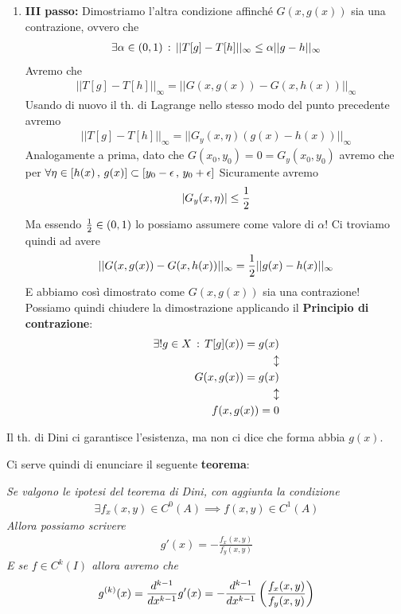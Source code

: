 \begin{enumerate}
	\item \textbf{III passo:} Dimostriamo l'altra condizione affinché $G(x,g(x))$ sia una contrazione, ovvero che
	\begin{align}
		\exists \alpha \in (0,1) \, : \, ||T[g] - T[h]||_\infty \leq \alpha || g -h  ||_\infty 
	\end{align}
	Avremo che
	\begin{align}
		||T[g] - T[h]||_\infty = ||G(x,g(x)) - G(x,h(x))||_\infty
	\end{align}
	Usando di nuovo il th. di Lagrange nello stesso modo del punto precedente avremo
	\begin{align}
		||T[g] - T[h]||_\infty = ||G_y(x,\eta) (g(x) -h(x))||_\infty
	\end{align}
	Analogamente a prima, dato che  $G(x_0,y_0)=0= G_y(x_0,y_0)$ avremo che per $\forall \eta \in [h(x)\, , \, g(x)]\subset[y_0 - \epsilon \, , \, y_0 + \epsilon]$
	Sicuramente avremo
	\begin{align}
		|G_y(x,\eta)|\leq \frac{1}{2}
	\end{align}
	Ma essendo $\frac{1}{2} \in (0,1)$ lo possiamo assumere come valore di $\alpha$! Ci troviamo quindi ad avere
	\begin{align}
		||G(x,g(x)) - G(x,h(x))||_\infty = \frac{1}{2}||g(x) - h(x)||_\infty
	\end{align}
	E abbiamo così dimostrato come $G(x,g(x))$ sia una contrazione! Possiamo quindi chiudere la dimostrazione applicando il \textbf{Principio di contrazione}:
	\begin{align}
		\exists ! g \in X \, : \, T[g](x)) = g(x)\\
		\updownarrow \nonumber \\ 
		G(x,g(x))=g(x) \\
		\updownarrow \nonumber \\
		f(x,g(x))=0
	\end{align}
\end{enumerate}

\newpage

Il th. di Dini ci garantisce l'esistenza, ma non  ci dice che forma abbia $g(x)$. 

Ci serve quindi di enunciare il seguente \textbf{teorema}:

\bigskip

\textit{Se valgono le ipotesi del teorema di Dini, con aggiunta la condizione}
\begin{align}
	\exists f_x(x,y)\in C^0(A)\implies f(x,y)\in C^1(A)
\end{align}
\textit{Allora possiamo scrivere}
\begin{align}
	g'(x)= - \frac{f_x(x,y)}{f_y(x,y)}
\end{align}
\textit{E se $f\in C^k(I)$ allora avremo che}
\begin{align}
	g^{(k)}(x) = \frac{d^{k-1} }{d x^{k-1}} g'(x)= - \frac{d^{k-1} }{d x^{k-1}} \left( \frac{f_x(x,y)}{f_y(x,y)} \right)
\end{align}

